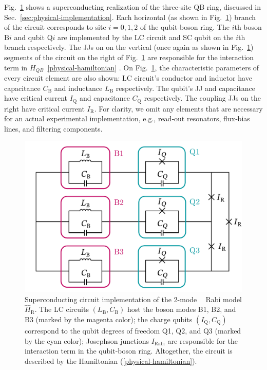 \documentclass[reprint, aps, prx, amsmath, amssymb, longbibliography, superscriptaddress]{revtex4-2}
\DeclareMathOperator{\Zthree}{\mathbb{Z}_3}
\begin{document}
Fig.~\ref{fig:superconducting-Rabi} shows a superconducting realization of the three‑site QB ring, discussed in Sec.~\ref{sec:physical-implementation}. Each horizontal (as shown in Fig.~\ref{fig:superconducting-Rabi}) branch of the circuit corresponds to site $i = 0,1,2$ of the qubit-boson ring. The $i$th boson $\mathrm{B}i$ and qubit $\mathrm{Q}i$ are implemented by the LC circuit and SC qubit on the $i$th branch respectively. The JJs on on the vertical (once again as shown in Fig.~\ref{fig:superconducting-Rabi}) segments of the circuit on the right of Fig.~\ref{fig:superconducting-Rabi} are responsible for the interaction term in $H_{QB}$~\eqref{physical-hamiltonian} \cite{siewert_aspects_2000,rasmussen_controllable_2019,shafranjuk_twoqubit_2006,allman_tunable_2014,hu_controllable_2007}. On Fig.~\ref{fig:superconducting-Rabi}, the characteristic parameters of every circuit element are also shown: LC circuit's conductor and inductor have capacitance $C_{\text{B}}$ and inductance $L_{\text{B}}$ respectively. The qubit's JJ and capacitance have critical current $I_{\text{Q}}$ and capacitance $C_{\text{Q}}$ respectively. The coupling JJs on the right have critical current $I_{\text{R}}$. For clarity, we omit any elements that are necessary for an actual experimental implementation, e.g., read‑out resonators, flux‑bias lines, and filtering components.

\begin{figure}[t]
  \includegraphics[width=\linewidth]{pics/SC_Rabi_circuit_with_contours.pdf}
  \caption{Superconducting circuit implementation of the 2-mode $\Zthree$ Rabi model $\hat H_{\text{R}}$. The LC circuits $(L_{\text{B}}, C_{\text{B}})$ host the boson modes B1, B2, and B3 (marked by the magenta color); the charge qubits $(I_{\text{Q}}, C_{\text{Q}})$ correspond to the qubit degrees of freedom Q1, Q2, and Q3 (marked by the cyan color); Josephson junctions $I_{\text{Rabi}}$ are responsible for the interaction term in the qubit-boson ring. Altogether, the circuit is described by the Hamiltonian (\ref{physical-hamiltonian}).}
  \label{fig:superconducting-Rabi}
\end{figure}
\end{document}
